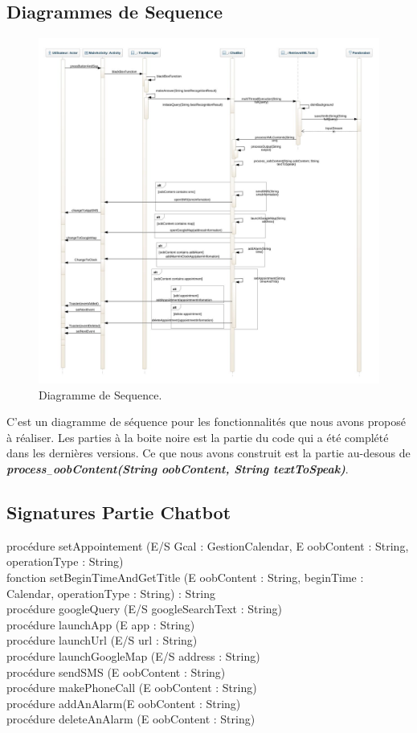 \subsection{Diagrammes de Sequence}
\begin{figure}[h]
\centering
\includegraphics[scale=0.447]{./diagrammes/SequenceDiagram.jpeg}
\caption{Diagramme de Sequence.\label{fig3}}
\end{figure}
\indent C'est un diagramme de séquence pour les fonctionnalités que nous avons proposé à réaliser. Les parties à la boite noire est la partie du code qui a été complété dans les dernières versions. Ce que nous avons construit est la partie au-desous de \textbf{\emph{process$_-$oobContent(String oobContent, String textToSpeak)}}.
\newpage
\newpage


\subsection{Signatures Partie Chatbot}
procédure setAppointement (E/S Gcal : GestionCalendar, E oobContent : String, operationType : String)\\
\indent fonction setBeginTimeAndGetTitle (E oobContent : String, beginTime : Calendar, operationType : String) : String\\
\indent procédure googleQuery (E/S googleSearchText : String)\\
\indent procédure launchApp (E app : String)\\
\indent procédure launchUrl (E/S url : String)\\
\indent procédure launchGoogleMap (E/S address : String)\\
\indent procédure sendSMS (E oobContent : String)\\
\indent procédure makePhoneCall (E oobContent : String)\\
\indent procédure addAnAlarm(E oobContent : String)\\
\indent procédure deleteAnAlarm (E oobContent : String)\\

